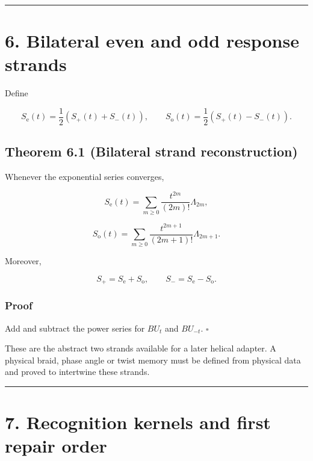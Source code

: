 \begin{center}\rule{0.5\linewidth}{0.5pt}\end{center}

\hypertarget{bilateral-even-and-odd-response-strands}{%
\section{6. Bilateral even and odd response strands}\label{bilateral-even-and-odd-response-strands}}

Define

\[
S_{\mathrm e}(t)
=\frac12(S_+(t)+S_-(t)),
\qquad
S_{\mathrm o}(t)
=\frac12(S_+(t)-S_-(t)).
\tag{6.1}
\]

\hypertarget{theorem-6.1-bilateral-strand-reconstruction}{%
\subsection{Theorem 6.1 (Bilateral strand reconstruction)}\label{theorem-6.1-bilateral-strand-reconstruction}}

Whenever the exponential series converges,

\[
\boxed{
S_{\mathrm e}(t)
=
\sum_{m\ge0}\frac{t^{2m}}{(2m)!}\Lambda_{2m},
}
\tag{6.2}
\]

\[
\boxed{
S_{\mathrm o}(t)
=
\sum_{m\ge0}\frac{t^{2m+1}}{(2m+1)!}\Lambda_{2m+1}.
}
\tag{6.3}
\]

Moreover,

\[
\boxed{S_+=S_{\mathrm e}+S_{\mathrm o},
\qquad
S_-=S_{\mathrm e}-S_{\mathrm o}.}
\tag{6.4}
\]

\hypertarget{proof-3}{%
\subsubsection{Proof}\label{proof-3}}

Add and subtract the power series for \(BU_t\) and \(BU_{-t}\). \(\square\)

These are the abstract two strands available for a later helical adapter. A
physical braid, phase angle or twist memory must be defined from physical data
and proved to intertwine these strands.

\begin{center}\rule{0.5\linewidth}{0.5pt}\end{center}

\hypertarget{recognition-kernels-and-first-repair-order}{%
\section{7. Recognition kernels and first repair order}\label{recognition-kernels-and-first-repair-order}}

